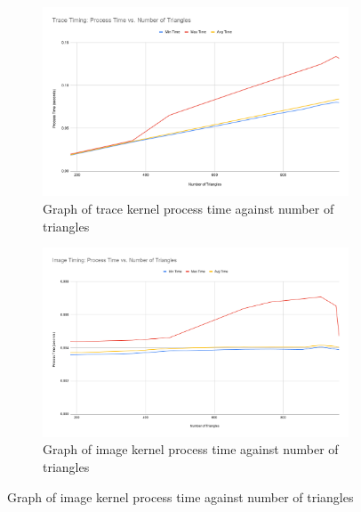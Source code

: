 \documentclass[final]{cmpreport}
\begin{document}
\begin{figure}
    \centering
    \begin{subfigure}{0.5\textwidth}
        \centering
        \includegraphics[width=0.9\linewidth]{img/Trace Timing Process Time vs. Number of Triangles.png}
        \caption{Graph of trace kernel process time against number of triangles}
        \label{graphtracetri}
    \end{subfigure}%
    \begin{subfigure}{0.5\textwidth}
        \centering
        \includegraphics[width=0.9\linewidth]{img/Image Timing Process Time vs. Number of Triangles.png}
        \caption{Graph of image kernel process time against number of triangles}
        \label{graphimagetri}
    \end{subfigure}
\end{figure}
\end{document}
